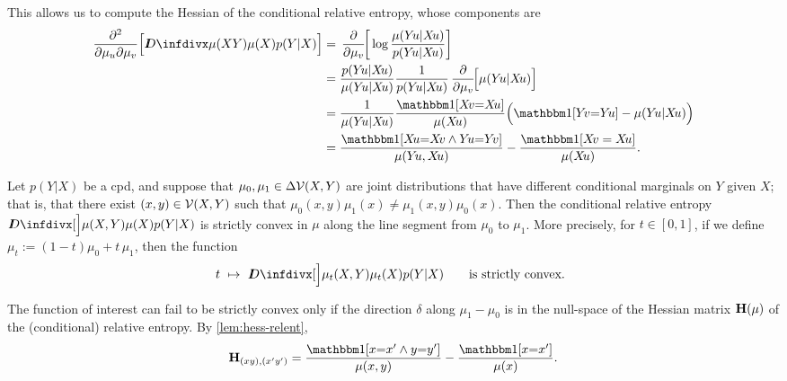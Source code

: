 \begin{subappendices}
\begin{lproof}
    This allows us to compute the Hessian of the conditional relative entropy, whose  components are
    \begin{align*}
        \frac{\partial^2}{\partial \mu_u \partial \mu_v} \Big[ \kldiv{\mu(XY)}{\mu(X)p(Y|X)}\Big]
        &=
        \pd/d\mu_v[ \log \frac{\mu(Y\! u | X\! u)}{  p(Y\! u | X\! u)} ] \\
        &=
        \frac{ p(Y\! u | X\! u)}{\mu(Y\! u | X\! u)} \frac1{ p(Y\! u | X\! u)}
        \pd/d\mu_v[ \mu(Y\! u | X\! u) ] \\
        &= \frac{1}{\mu(Y\! u | X\! u)}
            \frac{\mathbbm1[X\!v{=}X\!u]}{\mu(X\!u)}\Big( \mathbbm1[Y\!v{=}Y\!u] - \mu(Y\!u|X\!u) \Big)\\
        &= \frac{\mathbbm1[X\!u {=} X\!v \land Y\!u {=} Y\!v]}{\mu(Y\! u, X\! u)}
            - \frac{\mathbbm1[X\!v = X\!u]}{\mu(X\!u)}
        .
    \end{align*}


\end{lproof}


\begin{lemma}
    Let $p(Y|X)$ be a cpd,
    and suppose that $\mu_0, \mu_1 \in \Delta \mathcal V(X,Y)$ are joint distributions that have different conditional marginals on $Y$ given $X$; that is, that
    there exist $(x,y) \in \mathcal V(X,Y)$ such that
    $
        \mu_0(x,y) \mu_1(x)  \ne \mu_1(x,y) \mu_0(x).
    $
    Then the conditional relative entropy
    $
        \kldiv[\Big]{ \mu(X,Y) }{ \mu(X) p(Y|X) }
    $
    is strictly convex in $\mu$ along the line segment from $\mu_0$ to $\mu_1$.
    More precisely, for $t \in [0,1]$, if we define
    $\mu_t := (1-t) \mu_0 + t\, \mu_1$, then
    the function
    \[
    t ~\mapsto~ \kldiv[\Big]{ \mu_t(X,Y) }
        {\mu_t(X) p(Y|X)}
        \qquad\text{is strictly convex. }
    \]
    \label{lem:seg-strictcvx}
\end{lemma}
\begin{lproof}
    The function of interest can fail to be strictly convex only if the direction $\delta$ along $\mu_1-\mu_0$ is in the null-space of the Hessian matrix $\mathbf H(\mu)$ of the (conditional) relative entropy.
    By \cref{lem:hess-relent},
    \[
        \mat H_{(xy),(x'y')}
         = \frac{\mathbbm1[x {=} x' \land y {=} y']}{\mu(x,y)}
             - \frac{\mathbbm1[x {=} x']}{\mu(x)}.
    \]


\end{lproof}
\end{subappendices}

